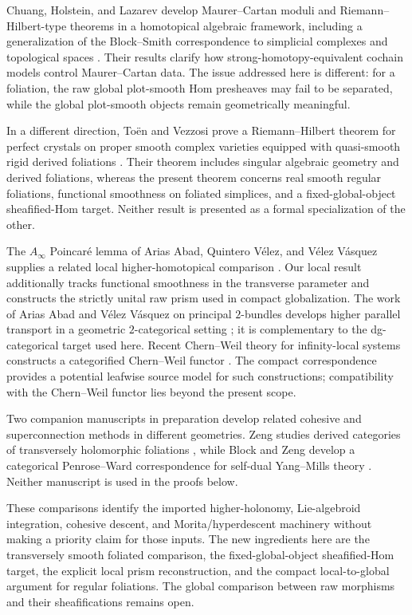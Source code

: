 \documentclass[12pt]{amsart}
\theoremstyle{definition}
\theoremstyle{remark}
\numberwithin{equation}{section}
\newcommand{\1}{{\mathbb{1}}}
\begin{document}
Chuang, Holstein, and Lazarev develop Maurer--Cartan moduli and
Riemann--Hilbert-type theorems in a homotopical algebraic framework,
including a generalization of the Block--Smith correspondence to
simplicial complexes and topological spaces \cite{CHL21}.  Their
results clarify how strong-homotopy-equivalent cochain models control
Maurer--Cartan data.  The issue addressed here is different: for a
foliation, the raw global plot-smooth Hom presheaves may
fail to be separated, while the global plot-smooth objects remain
geometrically meaningful.

In a different direction, To\"en and Vezzosi prove a
Riemann--Hilbert theorem for perfect
crystals on proper smooth complex varieties equipped with
quasi-smooth rigid derived foliations \cite{TV23}.  Their theorem
includes singular algebraic geometry and derived foliations, whereas
the present theorem concerns real smooth regular foliations,
functional smoothness on foliated simplices, and a
fixed-global-object sheafified-Hom target.  Neither result is presented
as a formal specialization of the other.

The $A_\infty$ Poincar\'e lemma of Arias Abad, Quintero V\'elez, and
V\'elez V\'asquez supplies a related local higher-homotopical
comparison \cite{AQVV19}.  Our local result additionally tracks
functional smoothness in the transverse parameter and constructs the
strictly unital raw prism used in compact globalization.  The work of
Arias Abad and V\'elez V\'asquez on principal $2$-bundles develops
higher parallel transport in a geometric $2$-categorical setting
\cite{AVV21}; it is complementary to the dg-categorical target used
here.  Recent Chern--Weil theory for infinity-local systems constructs
a categorified Chern--Weil functor \cite{AMV21}.  The compact
correspondence provides a potential leafwise source model for such
constructions; compatibility with the Chern--Weil functor lies beyond
the present scope.

Two companion manuscripts in preparation develop related
cohesive and superconnection methods in different geometries.
Zeng studies derived categories of transversely holomorphic
foliations \cite{ZengTransverseHolomorphicPrep}, while Block and Zeng
develop a categorical Penrose--Ward correspondence for self-dual
Yang--Mills theory \cite{BlockZengPenroseWardPrep}.  Neither manuscript
is used in the proofs below.

These comparisons identify the imported higher-holonomy,
Lie-algebroid integration, cohesive descent, and Morita/hyperdescent
machinery without making a priority claim for those inputs.  The new
ingredients here are the transversely smooth foliated comparison, the
fixed-global-object sheafified-Hom target, the explicit local prism
reconstruction, and the compact local-to-global argument for regular
foliations.  The global comparison between raw morphisms and their
sheafifications remains open.
\end{document}
